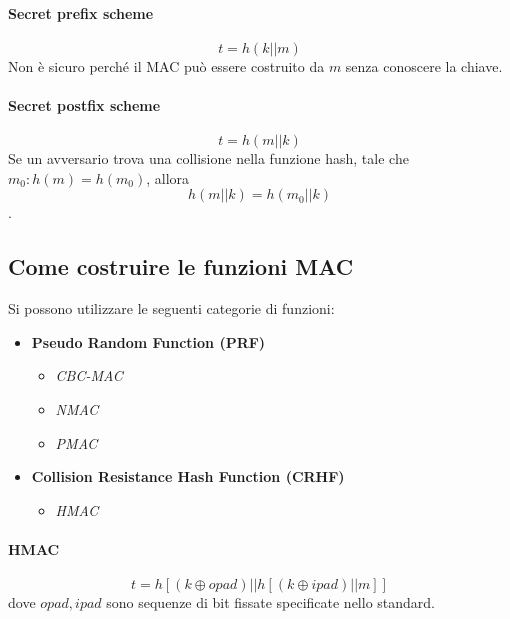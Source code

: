 \documentclass[a4paper,12pt]{article}
\begin{document}
\paragraph{Secret prefix scheme} 
$$t = h(k||m)$$
Non è sicuro perché il MAC può essere costruito da $m$ senza conoscere la chiave.

\paragraph{Secret postfix scheme}
$$t = h(m||k)$$
Se un avversario trova una collisione nella funzione hash, tale che $m_0 : h(m) = h(m_0)$, allora $$h(m||k) = h(m_0||k)$$.

\subsection{Come costruire le funzioni MAC}
Si possono utilizzare le seguenti categorie di funzioni:
\begin{itemize}
	\item \textbf{Pseudo Random Function (PRF)}
	\begin{itemize}
		\item \textit{CBC-MAC}
		\item \textit{NMAC}
		\item \textit{PMAC}
	\end{itemize}
	\item \textbf{Collision Resistance Hash Function (CRHF)}
	\begin{itemize}
		\item \textit{HMAC}
	\end{itemize}
\end{itemize}

\paragraph{HMAC}
$$ t = h[(k \oplus opad) || h[(k \oplus ipad) || m]]$$
dove $opad, ipad$ sono sequenze di bit fissate specificate nello standard.
\end{document}
